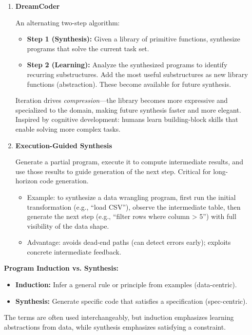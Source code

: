 \begin{enumerate}
    \item \textbf{DreamCoder}

    An alternating two-step algorithm:
    \begin{itemize}
        \item \textbf{Step 1 (Synthesis):} Given a library of primitive functions, synthesize programs that solve the current task set.
        \item \textbf{Step 2 (Learning):} Analyze the synthesized programs to identify recurring substructures. Add the most useful substructures as new library functions (abstraction). These become available for future synthesis.
    \end{itemize}
    Iteration drives \emph{compression}—the library becomes more expressive and specialized to the domain, making future synthesis faster and more elegant. Inspired by cognitive development: humans learn building-block skills that enable solving more complex tasks.

    \item \textbf{Execution-Guided Synthesis}

    Generate a partial program, execute it to compute intermediate results, and use those results to guide generation of the next step. Critical for long-horizon code generation.
    \begin{itemize}
        \item Example: to synthesize a data wrangling program, first run the initial transformation (e.g., ``load CSV''), observe the intermediate table, then generate the next step (e.g., ``filter rows where column > 5'') with full visibility of the data shape.
        \item Advantage: avoids dead-end paths (can detect errors early); exploits concrete intermediate feedback.
    \end{itemize}
\end{enumerate}

\textbf{Program Induction vs. Synthesis:}
\begin{itemize}
    \item \textbf{Induction:} Infer a general rule or principle from examples (data-centric).
    \item \textbf{Synthesis:} Generate specific code that satisfies a specification (spec-centric).
\end{itemize}
The terms are often used interchangeably, but induction emphasizes learning abstractions from data, while synthesis emphasizes satisfying a constraint.

